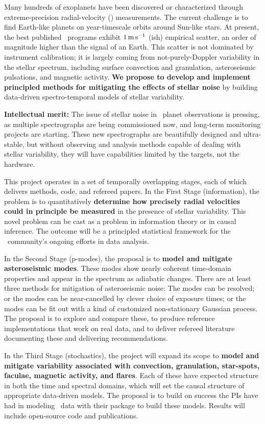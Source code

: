 \documentclass[12pt, fullpage, letterpaper]{article}
\begin{document}
\noindent
Many hundreds of exoplanets have been discovered or characterized
through extreme-precision radial-velocity (\EPRV) measurements.
The current challenge is to find
Earth-like planets on year-timescale orbits around Sun-like stars. At present, the best
published \EPRV\ programs exhibit $1\,{\mathrm{m\,s^{-1}}}$ (ish) empirical scatter, an
order of magnitude higher than the signal of an Earth. This scatter is
not dominated by instrument calibration; 
it is largely coming from not-purely-Doppler
variability in the stellar spectrum, including surface convection and
granulation, asteroseismic pulsations, and magnetic activity.
\textbf{We propose to develop and implement principled methods for mitigating
the effects of stellar noise} by building data-driven
spectro-temporal models of stellar variability.

\textbf{Intellectual merit:}
The issue of stellar noise in \RV\ planet observations is pressing,
as multiple spectrographs are being commissioned now, and long-term
monitoring projects are starting.
These new spectrographs are beautifully designed and ultra-stable,
but without observing and analysis methods capable of
dealing with stellar variability, they will have capabilities limited
by the targets, not the hardware.

This project operates in a set of temporally overlapping stages, each
of which delivers methods, code, and refereed papers. In the First
Stage (information), the problem is to quantitatively \textbf{determine how
precisely radial velocities could in principle be measured} in the
presence of stellar variability. This novel problem can be cast as a problem
in information theory or in causal inference.
The outcome will be a principled statistical framework for the
\EPRV\ community’s ongoing efforts in data analysis.

In the Second Stage (p-modes), the proposal is to \textbf{model and mitigate
asteroseismic modes}. These modes show nearly coherent time-domain
properties and appear in the spectrum as adiabatic changes. There are
at least three methods for mitigation of asteroseismic noise: The
modes can be resolved; or the modes can be
near-cancelled by clever choice of exposure times; or the modes can be
fit out with a kind of customized non-stationary
Gaussian process. The proposal is to explore and compare these, to
produce reference implementations that work on real data, and to deliver
refereed literature documenting these and delivering recommendations.

In the Third Stage (stochastics), the project will expand its scope to
\textbf{model and mitigate variability associated with convection, granulation,
star-spots, faculae, magnetic activity, and
flares}. Each of these have expected structure in both the time and
spectral domains, which will set the causal structure of appropriate
data-driven models. The proposal is to build on success the PIs have
had in modeling \EPRV\ data with their  package to build these
models. Results will include open-source code and publications.
\end{document}
